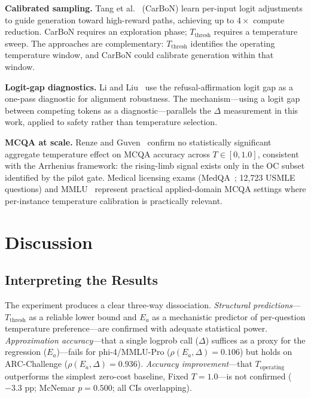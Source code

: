 \documentclass[11pt,letterpaper,twocolumn]{article}
\begin{document}
\textbf{Calibrated sampling.} Tang et al.~\cite{Tang2025} (CarBoN) learn per-input logit
adjustments to guide generation toward high-reward paths, achieving up to $4\times$
compute reduction. CarBoN requires an exploration phase; $T_\text{thresh}$ requires a
temperature sweep. The approaches are complementary: $T_\text{thresh}$ identifies the
operating temperature window, and CarBoN could calibrate generation within that window.

\textbf{Logit-gap diagnostics.} Li and Liu~\cite{Li2025} use the refusal-affirmation
logit gap as a one-pass diagnostic for alignment robustness. The mechanism---using a logit
gap between competing tokens as a diagnostic---parallels the $\Delta$ measurement in this
work, applied to safety rather than temperature selection.

\textbf{MCQA at scale.} Renze and Guven~\cite{Renze2024} confirm no statistically
significant aggregate temperature effect on MCQA accuracy across $T \in [0, 1.0]$,
consistent with the Arrhenius framework: the rising-limb signal exists only in the OC
subset identified by the pilot gate. Medical licensing exams (MedQA~\cite{Jin2020};
12,723 USMLE questions) and MMLU~\cite{Hendrycks2020} represent practical applied-domain
MCQA settings where per-instance temperature calibration is practically relevant.

\section{Discussion}

\subsection{Interpreting the Results}

The experiment produces a clear three-way dissociation. \emph{Structural predictions}---$T_\text{thresh}$
as a reliable lower bound and $E_a$ as a mechanistic predictor of per-question temperature
preference---are confirmed with adequate statistical power. \emph{Approximation accuracy}---that
a single logprob call ($\Delta$) suffices as a proxy for the regression ($E_a$)---fails
for phi-4/MMLU-Pro ($\rho(E_a, \Delta) = 0.106$) but holds on ARC-Challenge ($\rho(E_a,
\Delta) = 0.936$). \emph{Accuracy improvement}---that $T_\text{operating}$ outperforms
the simplest zero-cost baseline, Fixed $T=1.0$---is not confirmed ($-3.3$ pp; McNemar
$p=0.500$; all CIs overlapping).
\end{document}
